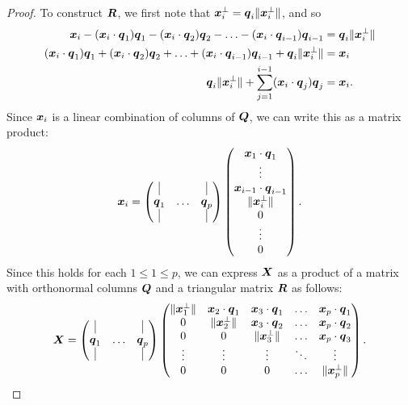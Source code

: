 \documentclass[12pt]{article}
\begin{document}
\begin{proof}
		To construct $\boldsymbol{R}$, we first note that $\boldsymbol{x}_i^{\perp}=\boldsymbol{q}_i\|\boldsymbol{x}_i^{\perp}\|$, and so
		\begin{align}
			\boldsymbol{x}_i-(\boldsymbol{x}_i\cdot\boldsymbol{q}_1)\boldsymbol{q}_1-
			(\boldsymbol{x}_i\cdot\boldsymbol{q}_2)\boldsymbol{q}_2-\ldots-(\boldsymbol{x}_i\cdot\boldsymbol{q}_{i-1})\boldsymbol{q}_{i-1}&=\boldsymbol{q}_i\|\boldsymbol{x}_i^{\perp}\|\\
			(\boldsymbol{x}_i\cdot\boldsymbol{q}_1)\boldsymbol{q}_1+
			(\boldsymbol{x}_i\cdot\boldsymbol{q}_2)\boldsymbol{q}_2+\ldots+(\boldsymbol{x}_i\cdot\boldsymbol{q}_{i-1})\boldsymbol{q}_{i-1}+\boldsymbol{q}_i\|\boldsymbol{x}_i^{\perp}\|&=\boldsymbol{x}_i\\
			\boldsymbol{q}_i\|\boldsymbol{x}_i^{\perp}\|+\sum_{j=1}^{i-1}(\boldsymbol{x}_i\cdot\boldsymbol{q}_j)\boldsymbol{q}_j&=\boldsymbol{x}_i.
		\end{align}
		Since $\boldsymbol{x}_i$ is a linear combination of columns of $\boldsymbol{Q}$, we can write this as a matrix product:
		\begin{equation}
			\bmx_i=\begin{pmatrix}
				\vline &  & \vline \\ \bmq_1 & \ldots & \bmq_p \\ \vline & & \vline
			\end{pmatrix}\begin{pmatrix}
			\bmx_1\cdot\bmq_1\\ \vdots \\ \bmx_{i-1}\cdot\bmq_{i-1} \\ \|\bmx_i^{\perp}\| \\ 0 \\ \vdots \\ 0
			\end{pmatrix}.
		\end{equation}
		Since this holds for each $1\leq 1\leq p$, we can express $\boldsymbol{X}$ as a product of a matrix with orthonormal columns $\boldsymbol{Q}$ and a triangular matrix $\boldsymbol{R}$ as follows:
		\begin{equation}
			\bmX=\begin{pmatrix}
				\vline &  & \vline \\ \bmq_1 & \ldots & \bmq_p \\ \vline & & \vline
			\end{pmatrix}\begin{pmatrix}
				\|\bmx_1^{\perp}\| & \bmx_2\cdot\bmq_1 & \bmx_3\cdot\bmq_1 & \ldots & \bmx_p\cdot\bmq_1 \\ 
				0 & \|\bmx_2^{\perp}\| & \bmx_3\cdot\bmq_2 &\ldots & \bmx_p\cdot\bmq_2\\ 
				0 & 0 & \|\bmx_3^{\perp}\| & \ldots & \bmx_p\cdot\bmq_3\\
				\vdots & \vdots & \vdots & \ddots & \vdots \\ 
				0 & 0 & 0 & \ldots & \|\bmx_p^{\perp}\|
			\end{pmatrix}.
		\end{equation}
	\end{proof}
	\pagebreak
\end{document}
